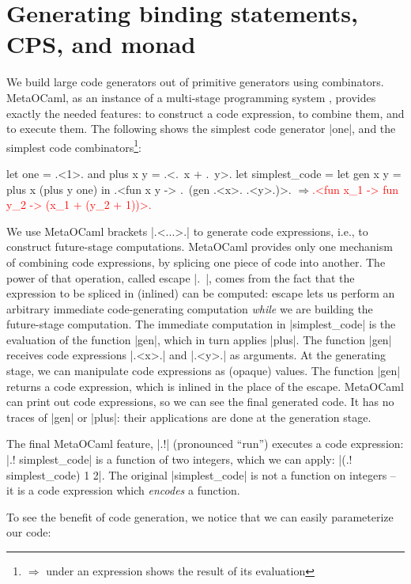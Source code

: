 \documentclass[draft]{elsart}
\newcommand{\evalresult}[1]{\ensuremath{\Longrightarrow}\textcolor{red}{#1}}
\begin{document}
\section{Generating binding statements, CPS, and monad}\label{CPS}

We build large code generators out of primitive generators using 
combinators. MetaOCaml, as an instance of a multi-stage
programming system \cite{TahaThesis}, provides exactly the needed
features: to construct a code expression, to combine them, and to
execute them. The following shows the simplest code generator |one|,
and the simplest code combinators\footnote{%
$\Longrightarrow$ under an expression shows the result of its evaluation}:

\begin{code}
let one = .<1>. and plus x y = .<.~x + .~y>.
let simplest_code = let gen x y = plus x (plus y one) in
  .<fun x y -> .~(gen .<x>. .<y>.)>.
\evalresult{.<fun x_1 -> fun y_2 -> (x_1 + (y_2 + 1))>.}
\end{code}

We use MetaOCaml brackets |.<...>.| to generate code expressions,
i.e., to construct future-stage computations. MetaOCaml provides only
one mechanism of combining code expressions, by splicing one
piece of code into
another. The power of that operation, called escape |.~|, comes from
the fact that the expression to be spliced in (inlined) can be
computed: escape lets us perform an arbitrary immediate code-generating
computation \emph{while} we are
building the future-stage computation. The immediate computation in
|simplest_code| is the evaluation of the function |gen|, which in turn
applies |plus|. The function |gen| receives code expressions |.<x>.|
and |.<y>.| as arguments. At the generating stage, we can manipulate
code expressions as (opaque) values. The function |gen| returns a code
expression, which is inlined in the place of the escape. MetaOCaml can
print out code expressions, so we can see the final generated code. It
has no traces of |gen| or |plus|: their applications are done at the
generation stage.

The final MetaOCaml feature, |.!| (pronounced ``run'') 
executes a code expression: |.! simplest_code| is a function of two
integers, which we can apply: |(.! simplest_code) 1 2|. The original
|simplest_code| is not a function on integers -- it is a code
expression which \emph{encodes} a function.

To see the benefit of code generation, we notice that we can easily
parameterize our code:
\end{document}
